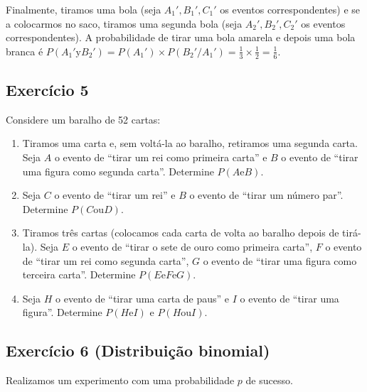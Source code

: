 Finalmente, tiramos uma bola (seja $A_1', B_1', C_1'$ os eventos
correspondentes) e se a colocarmos no saco, tiramos uma segunda bola
(seja $A_2', B_2', C_2'$ os eventos correspondentes). A probabilidade de
tirar uma bola amarela e depois uma bola branca é
${P(A_1' \text{y} B_2')} = P(A_1') \times {P(B_2' / A_1')} =
\frac{1}{3} \times \frac{1}{2} = \frac{1}{6}$.

\subsection*{Exercício 5}

Considere um baralho de 52 cartas:

\begin{enumerate}

  \item Tiramos uma carta e, sem voltá-la ao baralho, retiramos uma segunda carta.
  Seja $A$ o evento de ``tirar um rei como primeira carta''
  e $B$ o evento de ``tirar uma figura como segunda carta''.
  Determine $P(A \text{e} B)$.

\item Seja $C$ o evento de ``tirar um rei'' e $B$ o evento de
  ``tirar um número par''. Determine $P(C \text{ou} D)$.

\item Tiramos três cartas (colocamos cada carta de volta ao baralho depois de
  tirá-la).
  Seja $E$ o evento de ``tirar o sete de ouro como primeira carta'',
  $F$ o evento de ``tirar um rei como segunda carta'',
  $G$ o evento de ``tirar uma figura como terceira carta''. Determine
  $P(E \text{e} F \text{e} G)$.

\item Seja $H$ o evento de ``tirar uma carta de paus'' e $I$ o evento de
  ``tirar uma figura''. Determine $P(H \text{e} I)$ e $P(H \text{ou} I)$.

\end{enumerate}

\subsection*{Exercício 6 (Distribuição binomial)}

Realizamos um experimento com uma probabilidade $p$ de sucesso.

